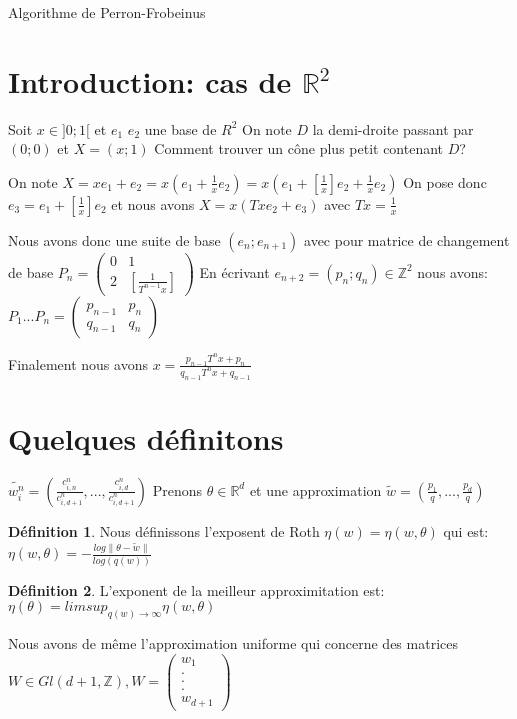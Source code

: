 \documentclass[12pt]{article}
\theoremstyle{plain}%
\theoremstyle{definition}
\newtheorem{dfnt}{Définition}[section]
\theoremstyle{remark}
\begin{document}
Algorithme de Perron-Frobeinus

\section{Introduction: cas de $\mathbb{R}^{2}$}

Soit $x \in ]0;1[$ et $e_1$ $e_2$ une base de $R^2$
On note $D$ la demi-droite passant par $(0;0)$ et $X=(x;1)$
Comment trouver un cône plus petit contenant $D$?

On note $X=xe_1+e_2=x(e_1+\frac{1}{x}e_2)=x(e_1+[\frac{1}{x}]e_2+{\frac{1}{x}}e_2)$
On pose donc $e_3=e_1+[\frac{1}{x}]e_2$ et nous avons $X=x(Txe_2+e_3)$ avec $Tx={\frac{1}{x}}$

Nous avons donc une suite de base $(e_n;e_{n+1})$ avec pour matrice de changement de base $P_n=
\begin{pmatrix}
   0 & 1 \\
   2 & [\frac{1}{T^{n-1}x}]
\end{pmatrix}$
En écrivant $e_{n+2}=(p_n;q_n)\in \mathbb{Z}^2$ nous avons:
$P_1...P_n=
\begin{pmatrix}
  p_{n-1} & p_n \\
  q_{n-1} & q_n
\end{pmatrix}$

Finalement nous avons $x=\frac{p_{n-1}T^n {x}+p_n}{q_{n-1}T^n x+q_{n-1}}$
\section{Quelques définitons}

$\tilde{w_i^n}=(\frac{c_{i,n}^n}{c^n_{i,d+1}},...,\frac{c^n_{i,d}}{c^n_{i,d+1}})$
Prenons $\theta \in \mathbb{R}^d$ et une approximation $\tilde{w}=(\frac{p_1}{q},...,\frac{p_d}{q})$
\begin{dfnt}
  Nous définissons l'exposent de Roth $\eta (w)=\eta(w,\theta)$ qui est:
  $\eta(w,\theta)=-\frac{log\| \theta - \tilde{w} \|}{log(q(w))}$
\end{dfnt}
\begin{dfnt}
  L'exponent de la meilleur approximitation est:
  $\eta(\theta)=limsup_{q(w) \to \infty} \eta(w,\theta)$
\end{dfnt}
Nous avons de même l'approximation uniforme qui concerne des matrices $W \in Gl(d+1,\mathbb{Z}), W=\begin{pmatrix}
w_1\\
. \\
. \\
. \\
w_{d+1}
\end{pmatrix}$
\end{document}
